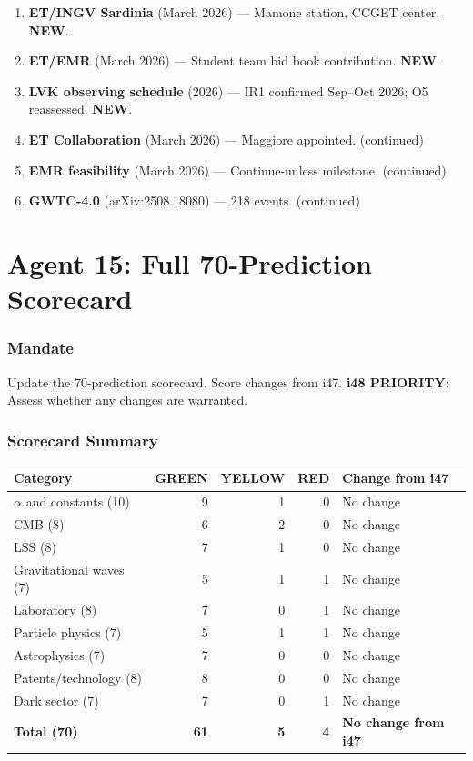 \documentclass[11pt,a4paper]{article}
\newcommand{\GREEN}{\textcolor{dfdgreen}{\textbf{GREEN}}}
\newcommand{\YELLOW}{\textcolor{dfdyellow}{\textbf{YELLOW}}}
\newcommand{\RED}{\textcolor{dfdred}{\textbf{RED}}}
\newcommand{\NEW}{\textcolor{dfdblue}{\textbf{NEW}}}
\begin{document}
\begin{enumerate}
\item \textbf{ET/INGV Sardinia} (March 2026) --- Mamone station, CCGET center. \NEW.
\item \textbf{ET/EMR} (March 2026) --- Student team bid book contribution. \NEW.
\item \textbf{LVK observing schedule} (2026) --- IR1 confirmed Sep--Oct 2026; O5 reassessed. \NEW.
\item \textbf{ET Collaboration} (March 2026) --- Maggiore appointed. (continued)
\item \textbf{EMR feasibility} (March 2026) --- Continue-unless milestone. (continued)
\item \textbf{GWTC-4.0} (arXiv:2508.18080) --- 218 events. (continued)
\end{enumerate}


\part{Agent 15: Full 70-Prediction Scorecard}
\label{part:agent15}

\section{Mandate}

Update the 70-prediction scorecard. Score changes from i47. \textbf{i48 PRIORITY}: Assess whether any changes are warranted.

\section{Scorecard Summary}

\begin{center}
\begin{tabular}{lrrrl}
\toprule
\textbf{Category} & \textbf{\GREEN} & \textbf{\YELLOW} & \textbf{\RED} & \textbf{Change from i47} \\
\midrule
$\alpha$ and constants (10) & 9 & 1 & 0 & No change \\
CMB (8) & 6 & 2 & 0 & No change \\
LSS (8) & 7 & 1 & 0 & No change \\
Gravitational waves (7) & 5 & 1 & 1 & No change \\
Laboratory (8) & 7 & 0 & 1 & No change \\
Particle physics (7) & 5 & 1 & 1 & No change \\
Astrophysics (7) & 7 & 0 & 0 & No change \\
Patents/technology (8) & 8 & 0 & 0 & No change \\
Dark sector (7) & 7 & 0 & 1 & No change \\
\midrule
\textbf{Total (70)} & \textbf{61} & \textbf{5} & \textbf{4} & \textbf{No change from i47} \\
\bottomrule
\end{tabular}
\end{center}
\end{document}
